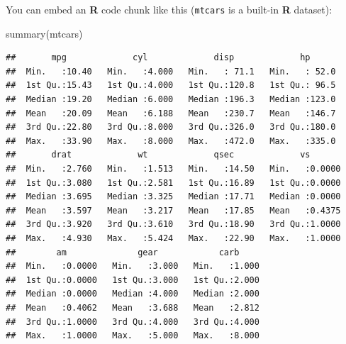 \documentclass{beamer}
\newenvironment{Shaded}{\begin{snugshade}}{\end{snugshade}}
\newcommand{\FunctionTok}[1]{\textcolor[rgb]{0.00,0.00,0.00}{#1}}
\newcommand{\NormalTok}[1]{#1}
\begin{document}
\begin{frame}[fragile]
You can embed an \textbf{R} code chunk like this (\texttt{mtcars} is a
built-in \textbf{R} dataset):

\begin{Shaded}
\begin{Highlighting}[]
\FunctionTok{summary}\NormalTok{(mtcars)}
\end{Highlighting}
\end{Shaded}

\begin{verbatim}
##       mpg             cyl             disp             hp       
##  Min.   :10.40   Min.   :4.000   Min.   : 71.1   Min.   : 52.0  
##  1st Qu.:15.43   1st Qu.:4.000   1st Qu.:120.8   1st Qu.: 96.5  
##  Median :19.20   Median :6.000   Median :196.3   Median :123.0  
##  Mean   :20.09   Mean   :6.188   Mean   :230.7   Mean   :146.7  
##  3rd Qu.:22.80   3rd Qu.:8.000   3rd Qu.:326.0   3rd Qu.:180.0  
##  Max.   :33.90   Max.   :8.000   Max.   :472.0   Max.   :335.0  
##       drat             wt             qsec             vs        
##  Min.   :2.760   Min.   :1.513   Min.   :14.50   Min.   :0.0000  
##  1st Qu.:3.080   1st Qu.:2.581   1st Qu.:16.89   1st Qu.:0.0000  
##  Median :3.695   Median :3.325   Median :17.71   Median :0.0000  
##  Mean   :3.597   Mean   :3.217   Mean   :17.85   Mean   :0.4375  
##  3rd Qu.:3.920   3rd Qu.:3.610   3rd Qu.:18.90   3rd Qu.:1.0000  
##  Max.   :4.930   Max.   :5.424   Max.   :22.90   Max.   :1.0000  
##        am              gear            carb      
##  Min.   :0.0000   Min.   :3.000   Min.   :1.000  
##  1st Qu.:0.0000   1st Qu.:3.000   1st Qu.:2.000  
##  Median :0.0000   Median :4.000   Median :2.000  
##  Mean   :0.4062   Mean   :3.688   Mean   :2.812  
##  3rd Qu.:1.0000   3rd Qu.:4.000   3rd Qu.:4.000  
##  Max.   :1.0000   Max.   :5.000   Max.   :8.000
\end{verbatim}
\end{frame}
\end{document}
